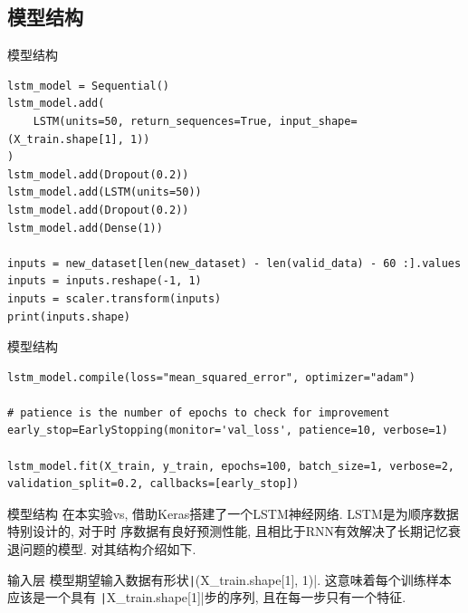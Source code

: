 \documentclass{beamer}
\begin{document}
\subsection{模型结构}
\begin{frame}[fragile]{模型结构}
	\begin{verbatim}
lstm_model = Sequential()
lstm_model.add(
    LSTM(units=50, return_sequences=True, input_shape=(X_train.shape[1], 1))
)
lstm_model.add(Dropout(0.2))
lstm_model.add(LSTM(units=50))
lstm_model.add(Dropout(0.2))
lstm_model.add(Dense(1))

inputs = new_dataset[len(new_dataset) - len(valid_data) - 60 :].values
inputs = inputs.reshape(-1, 1)
inputs = scaler.transform(inputs)
print(inputs.shape)
	\end{verbatim}
\end{frame}

\begin{frame}[fragile]{模型结构}
	\begin{verbatim}
lstm_model.compile(loss="mean_squared_error", optimizer="adam")

# patience is the number of epochs to check for improvement
early_stop=EarlyStopping(monitor='val_loss', patience=10, verbose=1)

lstm_model.fit(X_train, y_train, epochs=100, batch_size=1, verbose=2, validation_split=0.2, callbacks=[early_stop])
	\end{verbatim}
\end{frame}

\begin{frame}[fragile]{模型结构}
	在本实验vs, 借助Keras搭建了一个LSTM神经网络. LSTM是为顺序数据特别设计的, 对于时
	序数据有良好预测性能, 且相比于RNN有效解决了长期记忆衰退问题的模型. 对其结构介绍如下.

	\begin{block}{输入层}
		模型期望输入数据有形状\texttt|(X_train.shape[1], 1)|.
		这意味着每个训练样本应该是一个具有
		\texttt|X_train.shape[1]|步的序列, 且在每一步只有一个特征.
	\end{block}
\end{frame}
\end{document}
